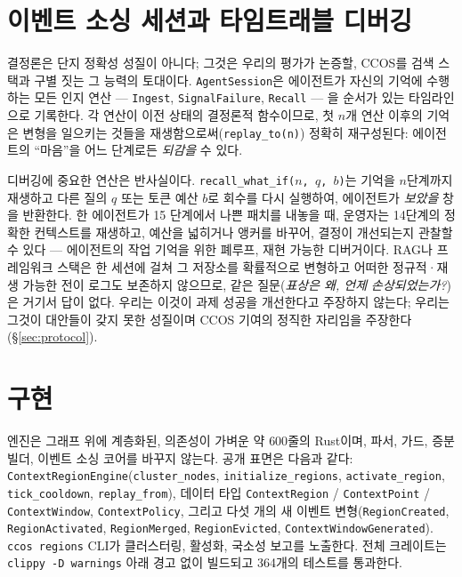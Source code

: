 \documentclass[11pt]{article}
\newcommand{\code}[1]{\texttt{#1}}
\begin{document}
\section{이벤트 소싱 세션과 타임트래블 디버깅}\label{sec:timetravel}

결정론은 단지 정확성 성질이 아니다; 그것은 우리의 평가가 논증할, CCOS를 검색 스택과 구별 짓는 그 능력의 토대이다.
\code{AgentSession}은 에이전트가 자신의 기억에 수행하는 모든 인지 연산 --- \code{Ingest}, \code{SignalFailure},
\code{Recall} --- 을 순서가 있는 타임라인으로 기록한다. 각 연산이 이전 상태의 결정론적 함수이므로, 첫 $n$개 연산
이후의 기억은 변형을 일으키는 것들을 재생함으로써(\code{replay\_to(n)}) 정확히 재구성된다: 에이전트의 ``마음''을
어느 단계로든 \emph{되감을} 수 있다.

디버깅에 중요한 연산은 반사실이다. \code{recall\_what\_if($n$, $q$, $b$)}는 기억을 $n$단계까지 재생하고 다른
질의 $q$ 또는 토큰 예산 $b$로 회수를 다시 실행하여, 에이전트가 \emph{보았을} 창을 반환한다. 한 에이전트가 15
단계에서 나쁜 패치를 내놓을 때, 운영자는 14단계의 정확한 컨텍스트를 재생하고, 예산을 넓히거나 앵커를 바꾸어,
결정이 개선되는지 관찰할 수 있다 --- 에이전트의 작업 기억을 위한 폐루프, 재현 가능한 디버거이다. RAG나 프레임워크
스택은 한 세션에 걸쳐 그 저장소를 확률적으로 변형하고 어떠한 정규적·재생 가능한 전이 로그도 보존하지 않으므로,
같은 질문(\emph{표상은 왜, 언제 손상되었는가?})은 거기서 답이 없다. 우리는 이것이 과제 성공을 개선한다고 주장하지
않는다; 우리는 그것이 대안들이 갖지 못한 성질이며 CCOS 기여의 정직한 자리임을 주장한다(\S\ref{sec:protocol}).

\section{구현}\label{sec:impl}

엔진은 그래프 위에 계층화된, 의존성이 가벼운 약 $600$줄의 Rust이며, 파서, 가드, 증분 빌더, 이벤트 소싱 코어를
바꾸지 않는다. 공개 표면은 다음과 같다: \code{ContextRegionEngine}(\code{cluster\_nodes},
\code{initialize\_regions}, \code{activate\_region}, \code{tick\_cooldown}, \code{replay\_from}), 데이터
타입 \code{ContextRegion} / \code{ContextPoint} / \code{ContextWindow}, \code{ContextPolicy}, 그리고 다섯 개의
새 이벤트 변형(\code{RegionCreated}, \code{RegionActivated}, \code{RegionMerged}, \code{RegionEvicted},
\code{ContextWindowGenerated}). \code{ccos regions} CLI가 클러스터링, 활성화, 국소성 보고를 노출한다. 전체
크레이트는 \code{clippy -D warnings} 아래 경고 없이 빌드되고 364개의 테스트를 통과한다.
\end{document}
